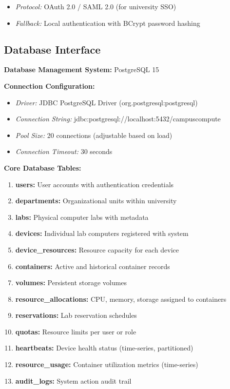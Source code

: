 \documentclass[12pt,a4paper]{article}
\begin{document}
\begin{itemize}
    \item \textit{Protocol:} OAuth 2.0 / SAML 2.0 (for university SSO)
    \item \textit{Fallback:} Local authentication with BCrypt password hashing
\end{itemize}

\subsection{Database Interface}
\label{sec:dbint}

\textbf{Database Management System:} PostgreSQL 15

\textbf{Connection Configuration:}

\begin{itemize}
    \item \textit{Driver:} JDBC PostgreSQL Driver (org.postgresql:postgresql)
    \item \textit{Connection String:} jdbc:postgresql://localhost:5432/campuscompute
    \item \textit{Pool Size:} 20 connections (adjustable based on load)
    \item \textit{Connection Timeout:} 30 seconds
\end{itemize}
\textbf{Core Database Tables:}

\begin{enumerate}
    \item \textbf{users:} User accounts with authentication credentials
    \item \textbf{departments:} Organizational units within university
    \item \textbf{labs:} Physical computer labs with metadata
    \item \textbf{devices:} Individual lab computers registered with system
    \item \textbf{device\_resources:} Resource capacity for each device
    \item \textbf{containers:} Active and historical container records
    \item \textbf{volumes:} Persistent storage volumes
    \item \textbf{resource\_allocations:} CPU, memory, storage assigned to containers
    \item \textbf{reservations:} Lab reservation schedules
    \item \textbf{quotas:} Resource limits per user or role
    \item \textbf{heartbeats:} Device health status (time-series, partitioned)
    \item \textbf{resource\_usage:} Container utilization metrics (time-series)
    \item \textbf{audit\_logs:} System action audit trail
\end{enumerate}
\end{document}
